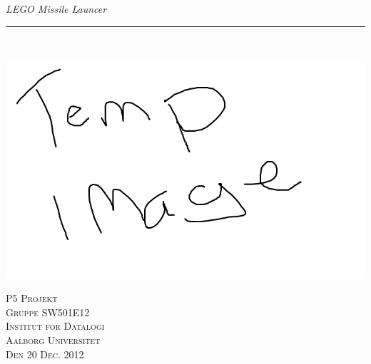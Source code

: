 \thispagestyle{empty}
\begin{flushright}
\vspace{3cm}

\phantom{hul}

\phantom{hul}

\phantom{hul}

\textsl{\Huge LEGO Missile Launcer} \\ \vspace{1cm}

\rule{13cm}{3mm} \\ \vspace{1.5cm}
\vspace{1cm}

\includegraphics[width=1.0\textwidth]{img/frontpage} 

\vspace{1.5cm} 
\textsc{\Large P5 Projekt \\
Gruppe SW501E12 \\
Institut for Datalogi\\
Aalborg Universitet\\
Den 20 Dec. 2012\\}
\end{flushright}
